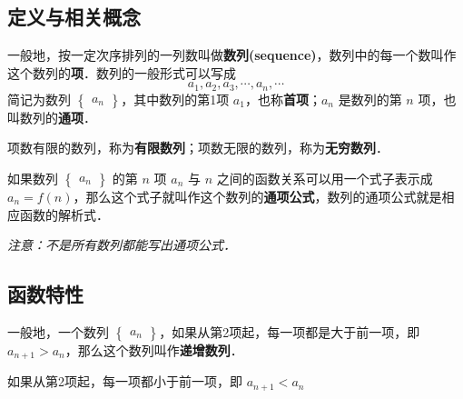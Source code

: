 
\begin{issues}
\issueDraft
\end{issues}

\subsection{定义与相关概念}
一般地，按一定次序排列的一列数叫做\textbf{数列(sequence)}，数列中的每一个数叫作这个数列的\textbf{项}．数列的一般形式可以写成
\begin{equation}
a_1,a_2,a_3,\cdots,a_n,\cdots
\end{equation}
简记为数列 $\begin{Bmatrix} a_n \end{Bmatrix}$，其中数列的第1项 $a_1$，也称\textbf{首项}；$a_n$ 是数列的第 $n$ 项，也叫数列的\textbf{通项}．

项数有限的数列，称为\textbf{有限数列}；项数无限的数列，称为\textbf{无穷数列}．

如果数列 $\begin{Bmatrix} a_n \end{Bmatrix}$ 的第 $n$ 项 $a_n$ 与 $n$ 之间的函数关系可以用一个式子表示成 $a_n = f(n)$，那么这个式子就叫作这个数列的\textbf{通项公式}，数列的通项公式就是相应函数的解析式．

\textsl{注意：不是所有数列都能写出通项公式．}

\subsection{函数特性}
一般地，一个数列 $\begin{Bmatrix} a_n \end{Bmatrix}$，如果从第2项起，每一项都是大于前一项，即 $a_{n+1}>a_n$，那么这个数列叫作\textbf{递增数列}．

如果从第2项起，每一项都小于前一项，即 $a_{n+1}<a_n$